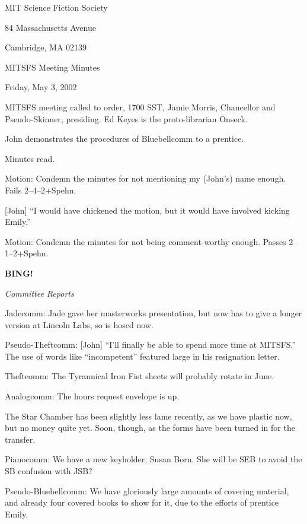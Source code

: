 \documentclass[12pt]{article}
\newcommand{\bing}{{\bf BING!} }
\newcommand{\goto}[1]{\bing \vskip 12pt \centerline{{\em{#1}}}}
\begin{document}
\begin{center}

MIT Science Fiction Society 

84 Massachusetts Avenue

Cambridge, MA 02139

\vspace{12pt}

MITSFS Meeting Minutes 

Friday, May 3, 2002

\end{center}
 
\vspace{18pt}

\setlength{\parskip}{6pt}

\noindent
MITSFS meeting called to order, 1700 SST, Jamie Morris, Chancellor and
Pseudo-Skinner, presiding.  Ed Keyes is the proto-librarian Onseck.

John demonstrates the procedures of Bluebellcomm to a prentice.

Minutes read.

Motion: Condemn the minutes for not mentioning my (John's) name enough.
Fails 2--4--2+Spehn.

[John] ``I would have chickened the motion, but it would have involved
kicking Emily.''

Motion: Condemn the minutes for not being comment-worthy enough.
Passes 2--1--2+Spehn.

\goto{Committee Reports}

Jadecomm: Jade gave her masterworks presentation, but now has to give
a longer version at Lincoln Labs, so is hosed now.

Pseudo-Theftcomm: [John] ``I'll finally be able to spend more time at
MITSFS.''  The use of words like ``incompetent'' featured large in his
resignation letter.

Theftcomm: The Tyrannical Iron Fist sheets will probably rotate in June.

Analogcomm: The hours request envelope is up.

The Star Chamber has been slightly less lame recently, as we have plastic
now, but no money quite yet.  Soon, though, as the forms have been turned
in for the transfer.

Pianocomm: We have a new keyholder, Susan Born.  She will be SEB to avoid
the SB confusion with JSB?

Pseudo-Bluebellcomm: We have gloriously large amounts of covering material,
and already four covered books to show for it, due to the efforts of
prentice Emily.
\end{document}
